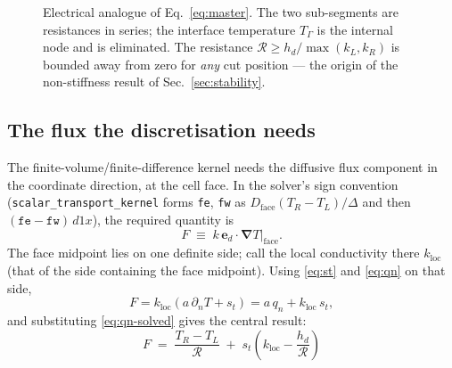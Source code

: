 \documentclass[11pt,a4paper]{article}
\newcommand{\ed}{\boldsymbol{e}_d}
\newcommand{\grad}{\boldsymbol{\nabla}}
\newcommand{\Rser}{\mathcal{R}}
\newcommand{\code}[1]{\texttt{#1}}
\begin{document}
\begin{figure}[htbp]
\centering
{}
\caption{Electrical analogue of Eq.~\eqref{eq:master}. The two sub-segments are
resistances in series; the interface temperature $T_\Gamma$ is the internal node
and is eliminated. The resistance $\Rser\ge h_d/\max(k_L,k_R)$ is bounded away
from zero for \emph{any} cut position --- the origin of the non-stiffness result
of Sec.~\ref{sec:stability}.}
\label{fig:resistance}
\end{figure}

\subsection{The flux the discretisation needs}

The finite-volume/finite-difference kernel needs the diffusive flux component in
the coordinate direction, at the cell face. In the solver's sign convention
(\code{scalar\_transport\_kernel} forms \code{fe}, \code{fw} as
$D_{\text{face}}(T_R-T_L)/\Delta$ and then $(\code{fe}-\code{fw})\,d1x$), the
required quantity is
\begin{equation}
  F \;\equiv\; k\,\ed\cdot\grad T\Big|_{\text{face}} .
\end{equation}
The face midpoint lies on one definite side; call the local conductivity there
$k_{\text{loc}}$ (that of the side containing the face midpoint). Using
\eqref{eq:st} and \eqref{eq:qn} on that side,
\begin{equation}
  F = k_{\text{loc}}\left(a\,\partial_nT + s_t\right)
    = a\,q_n + k_{\text{loc}}\,s_t ,
\end{equation}
and substituting \eqref{eq:qn-solved} gives the central result:
\begin{equation}
  \boxed{\;
  F \;=\; \frac{T_R-T_L}{\Rser}
        \;+\; s_t\left(k_{\text{loc}}-\frac{h_d}{\Rser}\right)
  \; }
  \label{eq:main}
\end{equation}
\end{document}
